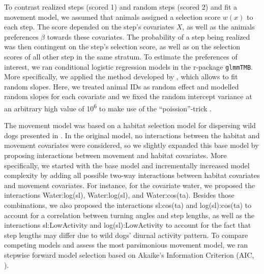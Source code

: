 \documentclass[abstract=on,10pt,a4paper,bibliography=totocnumbered]{article}
\begin{document}
To contrast realized steps (scored 1) and random steps (scored 2) and fit a
movement model, we assumed that animals assigned a selection score \(w(x)\) to
each step. The score depended on the step's covariates \(X\), as well as the
animals preferences \(\beta\) towards these covariates. The probability of a
step being realized was then contingent on the step's selection score, as well
as on the selection scores of all other step in the same stratum. To estimate
the preferences of interest, we ran conditional logistic regression models in
the r-package {\tt glmmTMB}. More specifically, we applied the method developed
by \citep{Muff.2020}, which allows to fit random slopes. Here, we treated animal
IDs as random effect and modelled random slopes for each covariate and we fixed
the random intercept variance at an arbitrary high value of
10\textsuperscript{6} to make use of the  ``poission''-trick  \citep{Muff.2020}.

The movement model was based on a habitat selection model for dispersing wild
dogs presented in \cite{Hofmann.2021}. In the original model, no interactions
between the habitat and movement covariates were considered, so we slightly
expanded this base model by proposing interactions between movement and habitat
covariates. More specifically, we started with the base model and incrementally
increased model complexity by adding all possible two-way interactions between
habitat covariates and movement covariates. For instance, for the covariate
\textsf{water}, we proposed the interactions \textsf{Water:log(sl)},
\textsf{Water:log(sl)}, and \textsf{Water:cos(ta)}. Besides those combinations,
we also proposed the interactions \textsf{sl:cos(ta)} and
\textsf{log(sl):cos(ta)} to account for a correlation between turning angles and
step lengths, as well as the interactions \textsf{sl:LowActivity} and
\textsf{log(sl):LowActivity} to account for the fact that step lengths may
differ due to wild dogs' diurnal activity pattern. To compare competing models
and assess the most parsimonious movement model, we ran stepwise forward model
selection based on Akaike's Information Criterion (AIC, \citealp{Burnham.2002}).
\end{document}
